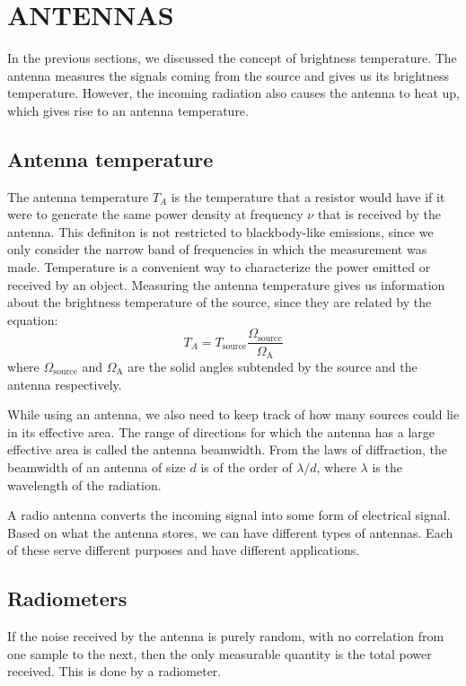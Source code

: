 \documentclass{article_saj}
\begin{document}
\section{ANTENNAS}
In the previous sections, we discussed the concept of brightness temperature. The antenna measures the signals coming from the source and gives us its brightness temperature. However, the incoming radiation also causes the antenna to heat up, which gives rise to an antenna temperature.

\subsection{Antenna temperature}
The antenna temperature $T_A$ is the temperature that a resistor would have if it were to generate the same power density at frequency $\nu$ that is received by the antenna. This definiton is not restricted to blackbody-like emissions, since we only consider the narrow band of frequencies in which the measurement was made. Temperature is a convenient way to characterize the power emitted or received by an object. Measuring the antenna temperature gives us information about the brightness temperature of the source, since they are related by the equation:
\begin{equation}
  T_A = T_{\text{source}}\frac{\Omega_{\text{source}}}{\Omega_{\text{A}}}
\end{equation}
where $\Omega_{\text{source}}$ and $\Omega_{\text{A}}$ are the solid angles subtended by the source and the antenna respectively.

While using an antenna, we also need to keep track of how many sources could lie in its effective area. The range of directions for which the antenna has a large effective area is called the antenna beamwidth. From the laws of diffraction, the beamwidth of an antenna of size $d$ is of the order of $\lambda/d$, where $\lambda$ is the wavelength of the radiation. 

A radio antenna converts the incoming signal into some form of electrical signal. Based on what the antenna stores, we can have different types of antennas. Each of these serve different purposes and have different applications.

\subsection{Radiometers}
If the noise received by the antenna is purely random, with no correlation from one sample to the next, then the only measurable quantity is the total power received. This is done by a radiometer.
\end{document}
